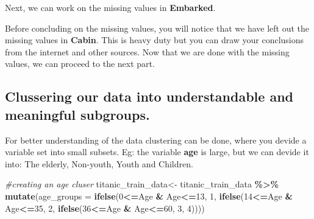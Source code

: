 \documentclass[
]{article}
\newenvironment{Shaded}{\begin{snugshade}}{\end{snugshade}}
\newcommand{\AttributeTok}[1]{\textcolor[rgb]{0.13,0.29,0.53}{#1}}
\newcommand{\CommentTok}[1]{\textcolor[rgb]{0.56,0.35,0.01}{\textit{#1}}}
\newcommand{\DecValTok}[1]{\textcolor[rgb]{0.00,0.00,0.81}{#1}}
\newcommand{\FunctionTok}[1]{\textcolor[rgb]{0.13,0.29,0.53}{\textbf{#1}}}
\newcommand{\NormalTok}[1]{#1}
\newcommand{\OtherTok}[1]{\textcolor[rgb]{0.56,0.35,0.01}{#1}}
\newcommand{\SpecialCharTok}[1]{\textcolor[rgb]{0.81,0.36,0.00}{\textbf{#1}}}
\newcommand{\StringTok}[1]{\textcolor[rgb]{0.31,0.60,0.02}{#1}}
\begin{document}
Next, we can work on the missing values in \textbf{Embarked}.

\begin{Shaded}
\end{Shaded}

Before concluding on the missing values, you will notice that we have
left out the missing values in \textbf{Cabin}. This is heavy duty but
you can draw your conclusions from the internet and other sources. Now
that we are done with the missing values, we can proceed to the next
part.

\hypertarget{clussering-our-data-into-understandable-and-meaningful-subgroups.}{%
\subsection{Clussering our data into understandable and meaningful
subgroups.}\label{clussering-our-data-into-understandable-and-meaningful-subgroups.}}

For better understanding of the data clustering can be done, where you
devide a variable set into small subsets. Eg: the variable \textbf{age}
is large, but we can devide it into: The elderly, Non-youth, Youth and
Children.

\begin{Shaded}
\begin{Highlighting}[]
\CommentTok{\#creating an age cluser}
\NormalTok{titanic\_train\_data}\OtherTok{\textless{}{-}}\NormalTok{ titanic\_train\_data }\SpecialCharTok{\%\textgreater{}\%}
  \FunctionTok{mutate}\NormalTok{(}\AttributeTok{age\_groups =} \FunctionTok{ifelse}\NormalTok{(}\DecValTok{0}\SpecialCharTok{\textless{}=}\NormalTok{Age }\SpecialCharTok{\&}\NormalTok{ Age}\SpecialCharTok{\textless{}=}\DecValTok{13}\NormalTok{, }\DecValTok{1}\NormalTok{, }\FunctionTok{ifelse}\NormalTok{(}\DecValTok{14}\SpecialCharTok{\textless{}=}\NormalTok{Age }\SpecialCharTok{\&}\NormalTok{ Age}\SpecialCharTok{\textless{}=}\DecValTok{35}\NormalTok{, }\DecValTok{2}\NormalTok{, }\FunctionTok{ifelse}\NormalTok{(}\DecValTok{36}\SpecialCharTok{\textless{}=}\NormalTok{Age }\SpecialCharTok{\&}\NormalTok{ Age}\SpecialCharTok{\textless{}=}\DecValTok{60}\NormalTok{, }\DecValTok{3}\NormalTok{, }\DecValTok{4}\NormalTok{))))}
\end{Highlighting}
\end{Shaded}
\end{document}
